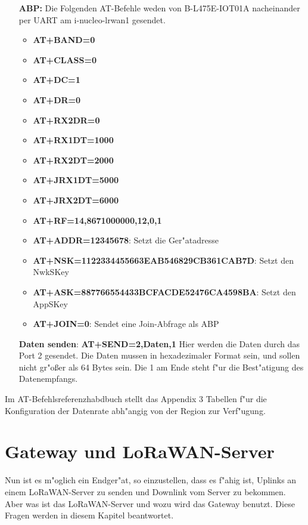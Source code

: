 \begin{itemize}
	\item[\textbf{ABP:}] Die Folgenden AT-Befehle weden von B-L475E-IOT01A nacheinander  per UART am i-nucleo-lrwan1 gesendet.
	\begin{itemize}
		\item \textbf{AT+BAND=0}
		\item \textbf{AT+CLASS=0} 
		\item \textbf{AT+DC=1}
		\item \textbf{AT+DR=0} 
		\item \textbf{AT+RX2DR=0}
		\item \textbf{AT+RX1DT=1000} 
		\item \textbf{AT+RX2DT=2000} 
		\item \textbf{AT+JRX1DT=5000}
		\item \textbf{AT+JRX2DT=6000} 
		\item \textbf{AT+RF=14,8671000000,12,0,1}
		\item \textbf{AT+ADDR=12345678}: Setzt die Ger"atadresse 
		\item \textbf{AT+NSK=1122334455663EAB546829CB361CAB7D}: Setzt den NwkSKey
		\item \textbf{AT+ASK=887766554433BCFACDE52476CA4598BA}: Setzt den AppSKey 
		\item \textbf{AT+JOIN=0}: Sendet eine Join-Abfrage als ABP
	\end{itemize}

	\item[\textbf{Daten senden}:] \textbf{AT+SEND=2,Daten,1}
	Hier werden die Daten durch das Port 2 gesendet. Die Daten mussen in hexadezimaler Format sein, und sollen nicht gr"o\ss{}er als 64 Bytes sein. Die 1 am Ende steht f"ur die Best"atigung des Datenempfangs. 
	
\end{itemize}

Im AT-Befehlsreferenzhabdbuch stellt das Appendix 3 Tabellen f"ur die Konfiguration der Datenrate abh"angig von der Region zur Verf"ugung.

\chapter{Gateway und LoRaWAN-Server}\label{G_S}

Nun ist es m"oglich ein Endger"at, so einzustellen, dass es f"ahig ist, Uplinks an einem LoRaWAN-Server zu senden und Downlink vom Server zu bekommen. Aber was ist das LoRaWAN-Server und wozu wird das Gateway benutzt. Diese Fragen werden in diesem Kapitel beantwortet.

